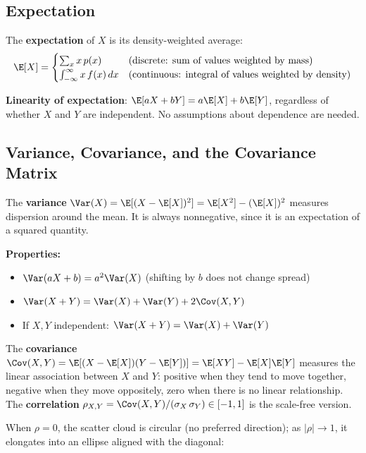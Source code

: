 \documentclass[main.tex]{subfiles}
\begin{document}
\subsection{Expectation}

The \textbf{expectation} of $X$ is its density-weighted average:
$$\E[X] = \begin{cases} \sum_x x\, p(x) & \text{(discrete: sum of values weighted by mass)} \\ \int_{-\infty}^{\infty} x\, f(x)\,dx & \text{(continuous: integral of values weighted by density)} \end{cases}$$

\textbf{Linearity of expectation}: $\E[aX + bY] = a\E[X] + b\E[Y]$, regardless of whether $X$ and $Y$ are independent. No assumptions about dependence are needed.

\subsection{Variance, Covariance, and the Covariance Matrix}

The \textbf{variance} $\Var(X) = \E[(X - \E[X])^2] = \E[X^2] - (\E[X])^2$ measures dispersion around the mean. It is always nonnegative, since it is an expectation of a squared quantity.

\textbf{Properties:}
\begin{itemize}
    \item $\Var(aX + b) = a^2\Var(X)$ (shifting by $b$ does not change spread)
    \item $\Var(X + Y) = \Var(X) + \Var(Y) + 2\Cov(X, Y)$
    \item If $X, Y$ independent: $\Var(X + Y) = \Var(X) + \Var(Y)$
\end{itemize}

The \textbf{covariance} $\Cov(X, Y) = \E[(X - \E[X])(Y - \E[Y])] = \E[XY] - \E[X]\E[Y]$ measures the linear association between $X$ and $Y$: positive when they tend to move together, negative when they move oppositely, zero when there is no linear relationship. The \textbf{correlation} $\rho_{X,Y} = \Cov(X, Y) / (\sigma_X\,\sigma_Y) \in [-1, 1]$ is the scale-free version.

When $\rho = 0$, the scatter cloud is circular (no preferred direction); as $|\rho| \to 1$, it elongates into an ellipse aligned with the diagonal:
\end{document}
